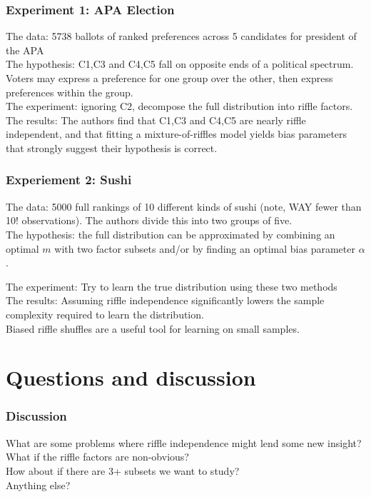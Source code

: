 \documentclass{beamer} %
\theoremstyle{definition} %
\def \pausenl {\pause $ \ $\\}
\begin{document}
\begin{frame}
	\frametitle{Experiment 1: APA Election}
	
	The data:  5738 ballots of ranked preferences across 5 candidates for president of the APA\\
	\pause
	The hypothesis: {C1,C3} and {C4,C5} fall on opposite ends of a political spectrum.  Voters may express a preference for one group over the other, then express preferences within the group.\\\pause
	The experiment: ignoring C2, decompose the full distribution into riffle factors.\\
	\pausenl
	
	The results:  The authors find that {C1,C3} and {C4,C5} are nearly riffle independent, and that fitting a mixture-of-riffles model yields bias parameters that strongly suggest their hypothesis is correct. 
	
\end{frame}

\begin{frame}
	\frametitle{Experiement 2: Sushi}
	The data: 5000 full rankings of 10 different kinds of sushi (note, WAY fewer than 10! observations).  The authors divide this into two groups of five. \\\pause
	The hypothesis: the full distribution can be approximated by combining an optimal $m$ with two factor subsets and/or by finding an optimal bias parameter $\alpha$.\\\pause
	
	The experiment: Try to learn the true distribution using these two methods\\
	\pausenl
	
	The results:  Assuming riffle independence significantly lowers the sample complexity required to learn the distribution.\\
	\pause Biased riffle shuffles are a useful tool for learning on small samples.
\end{frame}

\section{Questions and discussion}
\begin{frame}
	\frametitle{Discussion}
	What are some problems where riffle independence might lend some new insight?\\$\ $\\
	
	What if the riffle factors are non-obvious?\\$\ $\\
	
	How about if there are 3+ subsets we want to study?\\$\ $\\
	
	Anything else?
\end{frame}
\end{document}

